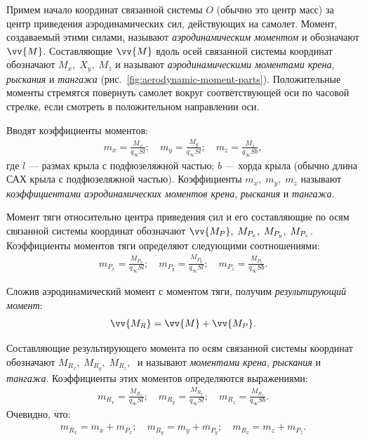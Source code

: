 	Примем начало координат связанной системы $O$ (обычно это центр масс) за центр приведения аэродинамических сил, действующих на самолет. Момент, создаваемый этими силами, называют \textit{аэродинамическим моментом} и обозначают $\protect\vv{M}$. Составляющие $\protect\vv{M}$ вдоль осей связанной системы координат обозначают $M_x,\; X_y,\; M_z$ и называют \textit{аэродинамическими моментами крена}, \textit{рыскания} и \textit{тангажа} (рис.~\ref{fig:aerodynamic-moment-parts}). Положительные моменты стремятся повернуть самолет вокруг соответствующей оси по часовой стрелке, если смотреть в положительном направлении оси.\par
	Вводят коэффициенты моментов:
	\begin{gather}
		m_x = \frac{M_x}{q_\infty Sl};\quad m_y = \frac{M_y}{q_\infty Sl};\quad m_z = \frac{M_z}{q_\infty Sb},
	\end{gather}
	где $l$ --- размах крыла с подфюзеляжной частью; $b$ --- хорда крыла (обычно длина САХ крыла с подфюзеляжной частью). Коэффициенты $m_x,\; m_y,\; m_z$ называют \textit{коэффициентами аэродинамических моментов крена}, \textit{рыскания} и \textit{тангажа}.\par
	Момент тяги относительно центра приведения сил и его составляющие по осям связанной системы координат обозначают $\vv{M_P},\; M_{P_x},\; M_{P_y},\; M_{P_z}$. Коэффициенты моментов тяги определяют следующими соотношениями:
	\begin{gather}
		m_{P_x} = \frac{M_{P_x}}{q_\infty Sl};\quad m_{P_y} = \frac{M_{P_y}}{q_\infty Sl};\quad m_{P_z} = \frac{M_{P_z}}{q_\infty Sb}.
	\end{gather}\par
	Сложив аэродинамический момент с моментом тяги, получим \textit{результирующий момент}:
	\begin{gather}
		\vv{M_R} = \vv{M} + \vv{M_P}.
	\end{gather}\par
	Составляющие результирующего момента по осям связанной системы координат обозначают $M_{R_x},\; M_{R_y},\; M_{R_z},\;$ и называют \textit{моментами крена}, \textit{рыскания} и \textit{тангажа}. Коэффициенты этих моментов определяются выражениями:
	\begin{gather}
		m_{R_x} = \frac{M_{R_x}}{q_\infty Sl};\quad m_{R_y} = \frac{M_{R_y}}{q_\infty Sl};\quad m_{R_z} = \frac{M_{R_z}}{q_\infty Sb}.
	\end{gather}
	Очевидно, что:
	\begin{gather}
		m_{R_x} = m_x + m_{P_x};\quad m_{R_y} = m_y + m_{P_y};\quad m_{R_z} = m_z + m_{P_z}.
	\end{gather}\par
